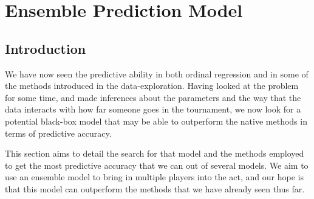 \documentclass[10pt,a4paper, hidelinks]{article} %
\begin{document}
%


\section{Ensemble Prediction Model}
\subsection{Introduction}

We have now seen the predictive ability in both ordinal regression and in some of the methods introduced in the data-exploration. Having looked at the problem for some time, and made inferences about the parameters and the way that the data interacts with how far someone goes in the tournament, we now look for a potential black-box model that may be able to outperform the native methods in terms of predictive accuracy. 

This section aims to detail the search for that model and the methods employed to get the most predictive accuracy that we can out of several models. We aim to use an ensemble model to bring in multiple players into the act, and our hope is that this model can outperform the methods that we have already seen thus far. 
\end{document}
